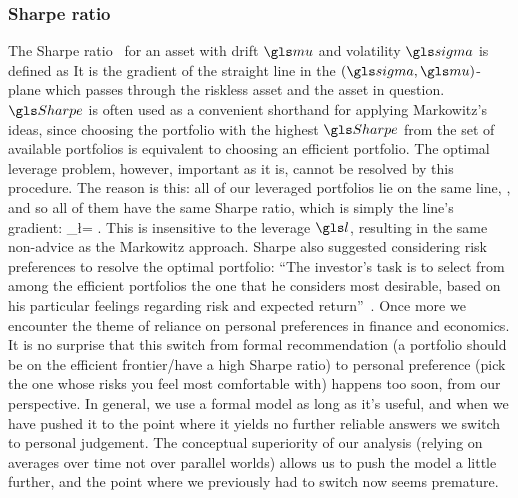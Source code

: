 \subsubsection{Sharpe ratio}
The Sharpe ratio~\cite{Sharpe1966} for an asset with drift $\gmu$ and volatility $\gsigma$ is defined as
\be
\Sharpe\equiv\frac{\gmu-\mur}{\gsigma}
\ee
It is the gradient of the straight line in the $(\gsigma, \gmu)$-plane which passes through the riskless asset and the asset in question. $\Sharpe$ is often used as a convenient shorthand for applying Markowitz's ideas, since choosing the portfolio with the highest $\Sharpe$ from the set of available portfolios is equivalent to choosing an efficient portfolio. The optimal leverage problem, however, important as it is, cannot be resolved by this procedure. The reason is this: all of our leveraged portfolios lie on the same line, , and so all of them have the same Sharpe ratio, which is simply the line's gradient:
\be
\Sharpe_\l = \frac{\mue}{\sigmas}.
\ee
This is insensitive to the leverage $\l$, resulting in the same non-advice as the Markowitz approach. Sharpe also suggested considering risk preferences to resolve the optimal portfolio: ``The investor's task is to select from among the efficient portfolios the one that he considers most desirable, based on his particular feelings regarding risk and expected return''~\cite{Sharpe1966}. Once more we encounter the theme of reliance on personal preferences in finance and economics. It is no surprise that this switch from formal recommendation (a portfolio should be on the efficient frontier/have a high Sharpe ratio) to personal preference (pick the one whose risks you feel most comfortable with) happens too soon, from our perspective. In general, we use a formal model as long as it's useful, and when we have pushed it to the point where it yields no further reliable answers we switch to personal judgement. The conceptual superiority of our analysis (relying on averages over time not over parallel worlds) allows us to push the model a little further, and the point where we previously had to switch now seems premature. 

